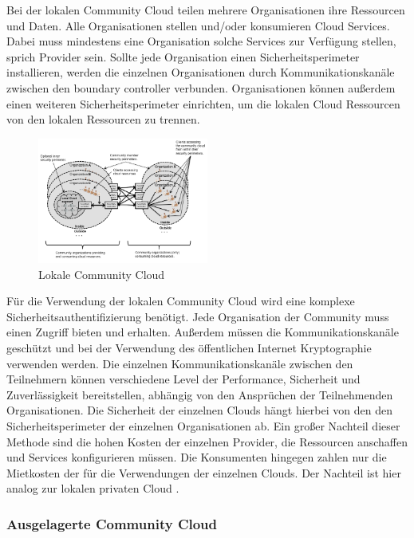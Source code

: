 Bei der lokalen Community Cloud teilen mehrere Organisationen ihre Ressourcen und Daten. Alle Organisationen stellen und/oder konsumieren Cloud Services.
Dabei muss mindestens eine Organisation solche Services zur Verfügung stellen, sprich Provider sein.
Sollte jede Organisation einen Sicherheitsperimeter installieren, werden die einzelnen Organisationen durch Kommunikationskanäle zwischen den \glqq boundary controller\grqq{}{}{}{} verbunden.
Organisationen können außerdem einen weiteren Sicherheitsperimeter einrichten, um die lokalen Cloud Ressourcen von den lokalen Ressourcen zu trennen.
\begin{figure}[h]
    \centering
	\includegraphics[width=0.5\textwidth]{Images/On-siteCommunityCloud}
	\caption{Lokale Community Cloud \cite{Badger}}
	\label{On-siteCommunityCloud}
\end{figure}
Für die Verwendung der lokalen Community Cloud wird eine komplexe Sicherheitsauthentifizierung benötigt. Jede Organisation der Community muss einen Zugriff bieten und erhalten.
Außerdem müssen die Kommunikationskanäle geschützt und bei der Verwendung des öffentlichen Internet Kryptographie verwenden werden. Die einzelnen Kommunikationskanäle zwischen den Teilnehmern 
können verschiedene Level der Performance, Sicherheit und Zuverlässigkeit bereitstellen, abhängig von den Ansprüchen der Teilnehmenden Organisationen. Die Sicherheit der einzelnen Clouds hängt 
hierbei von den den Sicherheitsperimeter der einzelnen Organisationen ab. Ein großer Nachteil dieser Methode sind die hohen Kosten der einzelnen Provider, die Ressourcen 
anschaffen und Services konfigurieren müssen. Die Konsumenten hingegen zahlen nur die Mietkosten der für die Verwendungen der einzelnen Clouds. Der Nachteil ist hier analog zur lokalen privaten Cloud \cite{Badger}.

\subsubsection{Ausgelagerte Community Cloud}

